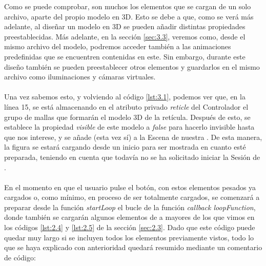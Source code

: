 \documentclass{subfiles}
\begin{document}
        Como se puede comprobar, son muchos los elementos que se cargan de un solo archivo, aparte del propio modelo en 3D. Esto se debe a que, como se verá más adelante, al diseñar un modelo en 3D se pueden añadir distintas propiedades preestablecidas. Más adelante, en la sección \ref{sec:3.3}, veremos como, desde el mismo archivo del modelo, podremos acceder también a las animaciones predefinidas que se encuentren contenidas en este. Sin embargo, durante este diseño también se pueden preestablecer otros elementos y guardarlos en el mismo archivo como iluminaciones y cámaras virtuales.

        \paragraph{}
        Una vez sabemos esto, y volviendo al código \ref{lst:3.1}, podemos ver que, en la línea 15, se está almacenando en el atributo privado \textit{reticle} del Controlador el grupo de mallas que formarán el modelo 3D de la retícula. Después de esto, se establece la propiedad \textit{visible} de este modelo a \textit{false} para hacerlo invisible hasta que nos interese, y se añade (esta vez sí) a la Escena de nuestra \ra. De esta manera, la figura se estará cargando desde un inicio para ser mostrada en cuanto esté preparada, teniendo en cuenta que todavía no se ha solicitado iniciar la Sesión de \ra.

        \paragraph{}
        En el momento en que el usuario pulse el botón, con estos elementos pesados ya cargados o, como mínimo, en proceso de ser totalmente cargados, se comenzará a preparar desde la función \textit{startLoop} el bucle de la función \textit{callback loopFunction}, donde también se cargarán algunos elementos de \threejs a mayores de los que vimos en los códigos \ref{lst:2.4} y \ref{lst:2.5} de la sección \ref{sec:2.3}. Dado que este código puede quedar muy largo si se incluyen todos los elementos previamente vistos, todo lo que se haya explicado con anterioridad quedará resumido mediante un comentario de código:
\end{document}
